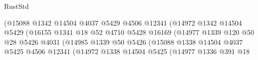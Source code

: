 \begin{lexlean}{RustStd}
\begin{coremodule}
                                              (@15088
                                                @1342
                                                @14504
                                                @4037
                                                @5429
                                                @4506
                                                @12341
                                                (@14972
                                                  @1342
                                                  @14504
                                                  @5429
                                                  (@16155
                                                    @1341
                                                    @18
                                                    @52
                                                    @4710
                                                    @5428
                                                    @16169
                                                    (@14977
                                                      @1339
                                                      @120
                                                      @50
                                                      @28
                                                      @5426
                                                      @4031
                                                      (@14985
                                                        @1339
                                                        @50
                                                        @5426
                                                        (@15088
                                                          @1338
                                                          @14504
                                                          @4037
                                                          @5425
                                                          @4506
                                                          @12341
                                                          (@14972
                                                            @1338
                                                            @14504
                                                            @5425
                                                            (@14977
                                                              @1336
                                                              @391
                                                              @18

\end{coremodule}
\end{lexlean}

